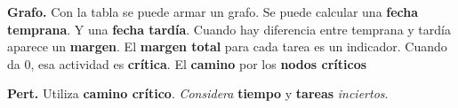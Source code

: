 \documentclass{article}
\begin{document}
\textbf{Grafo.} Con la tabla se puede armar un grafo.
Se puede calcular una \textbf{fecha temprana}.
Y una \textbf{fecha tardía}.
Cuando hay diferencia entre temprana y tardía aparece un \textbf{margen}.
El \textbf{margen total} para cada tarea es un indicador.
Cuando da 0, esa actividad es \textbf{crítica}.
El \textbf{camino} por los \textbf{nodos críticos} 

\textbf{Pert.}
Utiliza \textbf{camino crítico}.
\textit{Considera} \textbf{tiempo} y \textbf{tareas} \textit{inciertos}.
\end{document}
